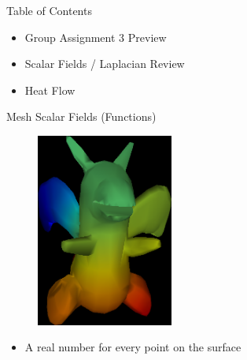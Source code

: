 \documentclass{beamer}
\begin{document}
\begin{frame}{Table of Contents}

\begin{itemize}[label=$\vartriangleright$]
	\item Group Assignment 3 Preview
\end{itemize}

\begin{itemize}[label=$\blacktriangleright$]
	\item Scalar Fields / Laplacian Review
\end{itemize}

\begin{itemize}[label=$\vartriangleright$]
	\item Heat Flow
\end{itemize}

\end{frame}


\begin{frame}{Mesh Scalar Fields (Functions)}

\begin{figure}[t]
    \includegraphics[width=0.4\textwidth]{DragonFunction.png}
\end{figure}

\begin{itemize}[label=$\vartriangleright$]
\item A real number for every point on the surface
\end{itemize}

\end{frame}
\end{document}
